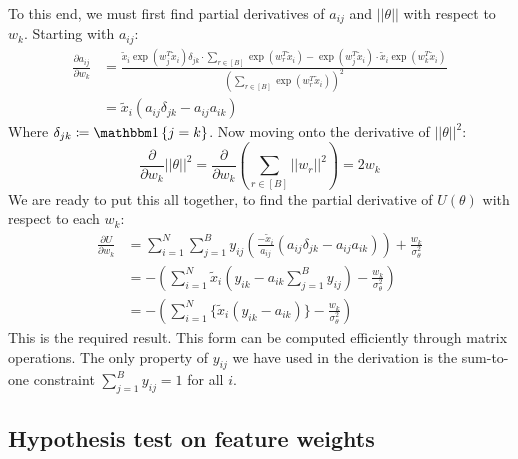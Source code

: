 To this end, we must first find partial derivatives of $a_{ij}$ and $||\theta||$ with respect to $w_k$. Starting with $a_{ij}$:
%
\begin{align}
	\frac{\partial a_{ij}}{\partial w_k} &= \frac
	{\tilde{x}_i \exp(w_j^T \tilde{x}_i) \delta_{jk} \cdot \sum_{r \in [B]} \exp(w_r^T \tilde{x}_i) 
		- 
		\exp(w_j^T \tilde{x}_i) \cdot \tilde{x}_i \exp(w_k^T \tilde{x}_i)}
	{\left( \sum_{r \in [B]} \exp(w_r^T \tilde{x}_i) \right)^2} \nonumber \\
	&= \tilde{x}_i \left( a_{ij} \delta_{jk} - a_{ij}a_{ik} \right) 
\end{align}
%
Where $\delta_{jk} \coloneqq \one \left\{ j = k \right\}$. Now moving onto the derivative of $||\theta||^2$:
%
\begin{equation}
	\frac{ \partial}{\partial w_k} ||\theta||^2 = \frac{\partial}{\partial w_k} \left( \sum_{r \in [B]} ||w_r||^2 \right) = 2w_k
\end{equation}
%
We are ready to put this all together, to find the partial derivative of $U(\theta)$ with respect to each $w_k$:
\begin{align}
	\frac{\partial U}{\partial w_k} &= 
	\sum_{i=1}^{N} \sum_{j=1}^{B} y_{ij} 
	\left( \frac{-\tilde{x}_i}{a_{ij}} \left( a_{ij} \delta_{jk} - a_{ij} a_{ik} \right) \right)
	+ \frac{w_k}{\sigma_\theta^2} \nonumber \\
	&=  - \left( \sum_{i=1}^{N} \tilde{x}_i \left( y_{ik} - a_{ik} \sum_{j=1}^{B} y_{ij} \right)
	- \frac{w_k}{\sigma_\theta^2} \right) \nonumber \\
	&= - \left( \sum_{i=1}^{N} \Big\{ \tilde{x}_i (y_{ik} - a_{ik}) \Big\} - \frac{w_k}{\sigma_\theta^2} \right)
\end{align}
%
This is the required result. This form can be computed efficiently through matrix operations. The only property of $y_{ij}$ we have used in the derivation is the sum-to-one constraint $\sum_{j=1}^{B} y_{ij} = 1$ for all $i$.

\subsection{Hypothesis test on feature weights}

